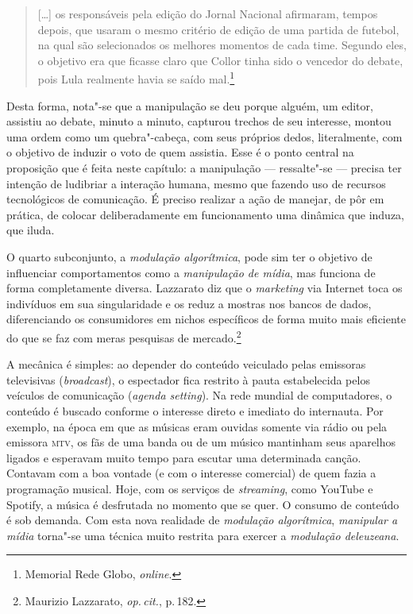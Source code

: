 \begin{quote}
{[}\ldots{}{]} os responsáveis pela edição do Jornal Nacional afirmaram, tempos
depois, que usaram o mesmo critério de edição de uma partida de futebol,
na qual são selecionados os melhores momentos de cada time. Segundo
eles, o objetivo era que ficasse claro que Collor tinha sido o vencedor
do debate, pois Lula realmente havia se saído mal.\footnote{Memorial Rede Globo,
\emph{online}.}
\end{quote}

Desta forma, nota"-se que a manipulação se deu porque alguém, um editor,
assistiu ao debate, minuto a minuto, capturou trechos de seu interesse,
montou uma ordem como um quebra"-cabeça, com seus próprios dedos,
literalmente, com o objetivo de induzir o voto de quem assistia. Esse é
o ponto central na proposição que é feita neste capítulo: a manipulação
--- ressalte"-se --- precisa ter intenção de ludibriar a interação humana,
mesmo que fazendo uso de recursos tecnológicos de comunicação. É preciso
realizar a ação de manejar, de pôr em prática, de colocar
deliberadamente em funcionamento uma dinâmica que induza, que iluda.

O quarto subconjunto, a \emph{modulação algorítmica}, pode sim ter o
objetivo de influenciar comportamentos como a \emph{manipulação de
mídia}, mas funciona de forma completamente diversa. Lazzarato diz que o
\emph{marketing} via Internet toca os indivíduos em sua singularidade e
os reduz a mostras nos bancos de dados, diferenciando os consumidores em
nichos específicos de forma muito mais eficiente do que se faz com meras
pesquisas de mercado.\footnote{Maurizio Lazzarato, \textit{op.\,cit.}, p.\,182.}

A mecânica é simples: ao depender do conteúdo veiculado pelas emissoras
televisivas (\emph{broadcast}), o espectador fica restrito à pauta
estabelecida pelos veículos de comunicação (\emph{agenda setting}). Na
rede mundial de computadores, o conteúdo é buscado conforme o interesse
direto e imediato do internauta. Por exemplo, na época em que as músicas
eram ouvidas somente via rádio ou pela emissora \textsc{mtv}, os fãs de uma banda
ou de um músico mantinham seus aparelhos ligados e esperavam muito tempo
para escutar uma determinada canção. Contavam com a boa vontade (e com o
interesse comercial) de quem fazia a programação musical. Hoje, com os
serviços de \emph{streaming}, como YouTube e Spotify, a música é
desfrutada no momento que se quer. O consumo de conteúdo é sob demanda.
Com esta nova realidade de \emph{modulação algorítmica}, \emph{manipular
a mídia} torna"-se uma técnica muito restrita para exercer a
\emph{modulação deleuzeana}.


